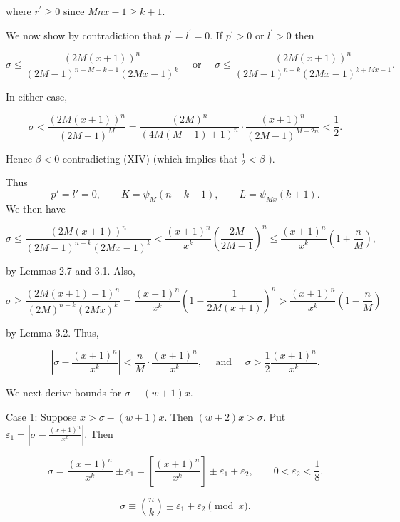 \documentclass[10pt,letterpaper]{article}
\newcommand{\origpage}[1]{\marginnote{\footnotesize\textbf{[#1]}}}
\begin{document}
where $r^{\prime} \geq 0$ since $M n x-1 \geq k+1$.

We now show by contradiction that $p^{\prime}=l^{\prime}=0$. If $p^{\prime}>0$ or $l^{\prime}>0$ then

\[
\sigma \leq \frac{(2 M(x+1))^{n}}{(2 M-1)^{n+M-k-1}(2 M x-1)^{k}} \quad \text { or } \quad \sigma \leq \frac{(2 M(x+1))^{n}}{(2 M-1)^{n-k}(2 M x-1)^{k+M x-1}} .
\]

In either case,

\[
\sigma<\frac{(2 M(x+1))^{n}}{(2 M-1)^{M}}=\frac{(2 M)^{n}}{(4 M(M-1)+1)^{n}} \cdot \frac{(x+1)^{n}}{(2 M-1)^{M-2 n}}<\frac{1}{2} .
\]

Hence $\beta<0$ \origpage{458}contradicting (XIV) (which implies that $\frac{1}{2}<\beta$ ).

Thus
\begin{equation*}
p'=l'=0,\qquad K=\psi_M(n-k+1),\qquad L=\psi_{Mx}(k+1).\tag{10}
\end{equation*}
We then have

\[
\sigma \leq \frac{(2 M(x+1))^{n}}{(2 M-1)^{n-k}(2 M x-1)^{k}}<\frac{(x+1)^{n}}{x^{k}}\left(\frac{2 M}{2 M-1}\right)^{n} \leq \frac{(x+1)^{n}}{x^{k}}\left(1+\frac{n}{M}\right),
\]

by Lemmas 2.7 and 3.1. Also,

\[
\sigma \geq \frac{(2 M(x+1)-1)^{n}}{(2 M)^{n-k}(2 M x)^{k}}=\frac{(x+1)^{n}}{x^{k}}\left(1-\frac{1}{2 M(x+1)}\right)^{n}>\frac{(x+1)^{n}}{x^{k}}\left(1-\frac{n}{M}\right)
\]

by Lemma 3.2. Thus,


\begin{equation*}
\left|\sigma-\frac{(x+1)^{n}}{x^{k}}\right|<\frac{n}{M} \cdot \frac{(x+1)^{n}}{x^{k}}, \quad \text { and } \quad \sigma>\frac{1}{2} \frac{(x+1)^{n}}{x^{k}} . \tag{11}
\end{equation*}


We next derive bounds for $\sigma-(w+1) x$.

Case 1: Suppose $x>\sigma-(w+1) x$. Then $(w+2) x>\sigma$. Put $\varepsilon_{1}=\left|\sigma-\frac{(x+1)^{n}}{x^{k}}\right|$. Then


\begin{equation*}
\sigma=\frac{(x+1)^n}{x^k}\pm\varepsilon_1
=\left[\frac{(x+1)^n}{x^k}\right]\pm\varepsilon_1+\varepsilon_2,
\qquad 0<\varepsilon_2<\frac18.\tag{12}
\end{equation*}



\begin{equation*}
\sigma\equiv\binom nk\pm\varepsilon_1+\varepsilon_2\pmod x.\tag{13}
\end{equation*}
\end{document}
